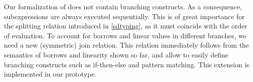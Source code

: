 Our formalization of \lang does not contain branching constructs. As a consequence,
subexpressions are always executed sequentially. This is of great importance
for the splitting relation introduced in \cref{sdtyping}, as it must
coincide with the order of evaluation. To account for borrows and linear
values in different branches, we need a new (symmetric) join relation.
This relation immediately follows from the semantics of borrows and linearity
shown so far, and allow to easily define branching constructs such as if-then-else
and pattern matching.
This extension is implemented in our prototype.

\lstDeleteShortInline@

